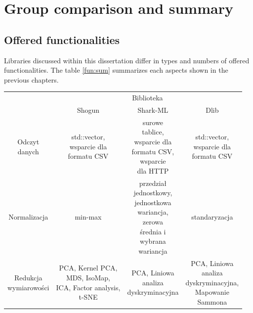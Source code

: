 \chapter{Group comparison and summary}

\section{Offered functionalities}

Libraries discussed within this dissertation differ in types and numbers of offered functionalities. The table \ref{fun:sum} summarizes each aspects shown in the previous chapters.

\begin{longtable}{c | c | c | c}
	\centering
	\multirow{2}{*}{\makecell{Funkcjonalność}} & \multicolumn{3}{c}{Biblioteka} \\
	\cline{2-4}
	 &  Shogun & Shark-ML & Dlib \\
	\hline
	\makecell{Odczyt \\ danych} & \makecell{std::vector, \\ wsparcie dla \\ formatu CSV} & \makecell{surowe \\ tablice, \\ wsparcie dla \\ formatu CSV, \\ wsparcie \\ dla HTTP} & \makecell{std::vector, \\ wsparcie dla \\ formatu CSV} \\
	\hline
	{Normalizacja} & min-max & \makecell{przedział \\ jednostkowy, \\ jednostkowa \\ wariancja, \\ zerowa \\ średnia i \\ wybrana \\ wariancja} & standaryzacja \\
	\hline
	\makecell{Redukcja \\ wymiarowości} & \makecell{PCA, Kernel PCA, \\ MDS, IsoMap, \\ ICA, Factor analysis, \\t-SNE} & \makecell{PCA, Liniowa \\ analiza \\ dyskryminacyjna} & \makecell{PCA, Liniowa \\ analiza \\ dyskryminacyjna, \\ Mapowanie \\ Sammona} \\

\end{longtable}
